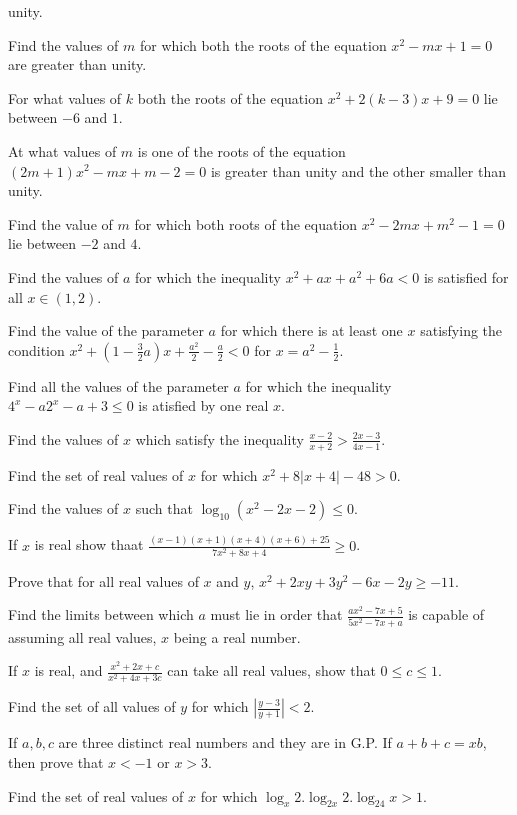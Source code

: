   unity.
\item Find the values of $m$ for which both the roots of the equation $x^2 - mx + 1 = 0$ are greater than
  unity.
\item For what values of $k$ both the roots of the equation $x^2 + 2(k - 3)x + 9 = 0$ lie between $-6$ and
  $1$.
\item At what values of $m$ is one of the roots of the equation $(2m + 1)x^2 - mx + m - 2 = 0$ is greater
  than unity and the other smaller than unity.
\item Find the value of $m$ for which both roots of the equation $x^2 - 2mx + m^2 - 1 = 0$ lie between $-2$
  and $4$.
\item Find the values of $a$ for which the inequality $x^2 + ax + a^2 + 6a < 0$ is satisfied for all
  $x\in(1, 2)$.
\item Find the value of the parameter $a$ for which there is at least one $x$ satisfying the condition $x^2
  + \left(1 - \frac{3}{2}a\right)x + \frac{a^2}{2} - \frac{a}{2} < 0$ for $x = a^2 - \frac{1}{2}$.
\item Find all the values of the parameter $a$ for which the inequality $4^x - a2^x - a + 3\leq 0$ is
  atisfied by one real $x$.
\item Find the values of $x$ which satisfy the inequality $\frac{x - 2}{x + 2} > \frac{2x - 3}{4x - 1}$.
\item Find the set of real values of $x$ for which $x^2 + 8|x + 4| - 48 > 0$.
\item Find the values of $x$ such that $\log_{10}(x^2 - 2x - 2)\leq 0$.
\item If $x$ is real show thaat $\frac{(x - 1)(x + 1)(x + 4)(x + 6) + 25}{7x^2 + 8x + 4}\geq 0$.
\item Prove that for all real values of $x$ and $y$, $x^2 + 2xy + 3y^2 - 6x - 2y\geq -11$.
\item Find the limits between which $a$ must lie in order that $\frac{ax^2 - 7x + 5}{5x^2 - 7x + a}$ is
  capable of assuming all real values, $x$ being a real number.
\item If $x$ is real, and $\frac{x^2 + 2x + c}{x^2 + 4x + 3c}$ can take all real values, show that $0\leq
  c\leq 1$.
\item Find the set of all values of $y$ for which $\left|\frac{y - 3}{y + 1}\right| < 2$.
\item If $a, b, c$ are three distinct real numbers and they are in G.P. If $a + b + c = xb$, then prove that
  $x < -1$ or $x > 3$.
\item Find the set of real values of $x$ for which $\log_x2.\log_{2x}2.\log_24x > 1$.
